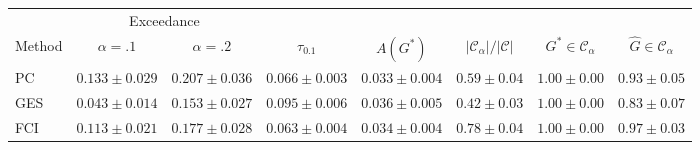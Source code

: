 \begin{tabular}{lccccccc}
\toprule
 & \multicolumn{2}{c}{Exceedance} & & & & & \\ \cmidrule(lr){2-3}
Method & $\alpha{=}.1$ & $\alpha{=}.2$ & $\tau_{0.1}$ & $A(G^\ast)$ & $|\mathcal{C}_\alpha|/|\mathcal{C}|$ & $G^\ast\in\mathcal{C}_\alpha$ & $\widehat G\in\mathcal{C}_\alpha$ \\
\midrule
PC & $0.133\pm0.029$ & $0.207\pm0.036$ & $0.066\pm0.003$ & $0.033\pm0.004$ & $0.59\pm0.04$ & $1.00\pm0.00$ & $0.93\pm0.05$ \\
GES & $0.043\pm0.014$ & $0.153\pm0.027$ & $0.095\pm0.006$ & $0.036\pm0.005$ & $0.42\pm0.03$ & $1.00\pm0.00$ & $0.83\pm0.07$ \\
FCI & $0.113\pm0.021$ & $0.177\pm0.028$ & $0.063\pm0.004$ & $0.034\pm0.004$ & $0.78\pm0.04$ & $1.00\pm0.00$ & $0.97\pm0.03$ \\
\bottomrule
\end{tabular}
